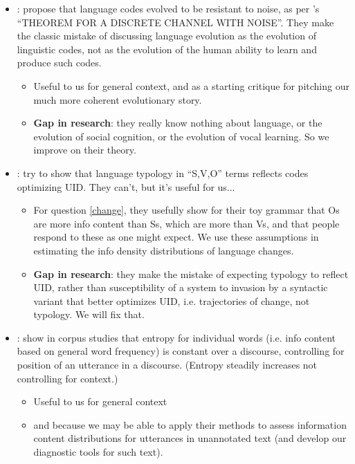 \documentclass[11pt]{article}
\begin{document}
\begin{itemize}
\begin{itemize}
	\end{itemize}
	\item \citet{plotkinnowak2000}: propose that language codes evolved to be resistant to noise, as per \citet{shannon1948}'s ``THEOREM FOR A DISCRETE CHANNEL WITH NOISE''. They make the classic mistake of discussing language evolution as the evolution of linguistic codes, not as the evolution of the human ability to learn and produce such codes.
	\begin{itemize}
		\item Useful to us for general context, and as a starting critique for pitching our much more coherent evolutionary story.
		\item \textbf{Gap in research}: they really know nothing about language, or the evolution of social cognition, or the evolution of vocal learning. So we improve on their theory.
	\end{itemize}
	\item \citet{mauritsetal2010}: try to show that language typology in ``S,V,O'' terms reflects codes optimizing UID. They can't, but it's useful for us...
	\begin{itemize}
		\item For question \ref{change}, they usefully show for their toy grammar that Os are more info content than Ss, which are more than Vs, and that people respond to these as one might expect. We use these assumptions in estimating the info density distributions of language changes.
		\item \textbf{Gap in research}: they make the mistake of expecting typology to reflect UID, rather than susceptibility of a system to invasion by a syntactic variant that better optimizes UID, i.e. trajectories of change, not typology. We will fix that.
	\end{itemize}
	\item \citet{genzelcharniak2002}: show in corpus studies that entropy for individual words (i.e. info content based on general word frequency) is constant over a discourse, controlling for position of an utterance in a discourse. (Entropy steadily increases not controlling for context.) 
	\begin{itemize}
		\item Useful to us for general context
		\item and because we may be able to apply their methods to assess information content distributions for utterances in unannotated text (and develop our diagnostic tools for such text).
	\end{itemize}

\end{itemize}
\end{document}
